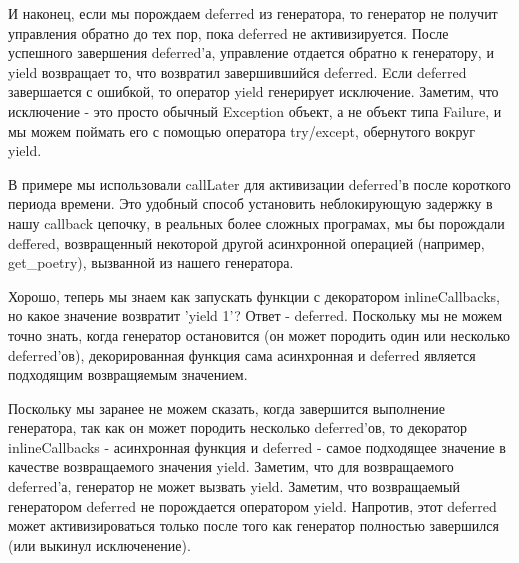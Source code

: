 И наконец, если мы порождаем deferred из генератора, 
то генератор не получит управления обратно до тех пор, пока 
deferred не активизируется. После успешного завершения deferred'а, 
управление отдается обратно к генератору, и yield возвращает 
то, что возвратил завершившийся deferred. Eсли 
deferred завершается с ошибкой, то оператор yield генерирует 
исключение. Заметим, что исключение - это просто обычный 
Exception объект, а не объект типа Failure, и мы можем 
поймать его с помощью оператора try/except, обернутого вокруг yield.


В примере мы использовали callLater для активизации  
deferred'в после короткого периода времени. Это удобный 
способ установить неблокирующую задержку в нашу callback 
цепочку, в реальных более сложных програмах, 
мы бы порождали deffered, возвращенный 
некоторой другой асинхронной операцией (например, get\_poetry), 
вызванной из нашего генератора.


Хорошо, теперь мы знаем как запускать функции с декоратором inlineCallbacks, 
но какое значение возвратит 'yield 1'? Ответ - deferred. 
Поскольку мы не можем точно знать, 
когда генератор остановится (он может породить один или 
несколько deferred'ов), декорированная функция сама асинхронная и 
deferred является подходящим возвращяемым значением. 


Поскольку мы заранее не можем сказать, когда 
завершится выполнение генератора, так как он 
может породить несколько deferred'ов, то 
декоратор inlineCallbacks - асинхронная функция 
и deferred - самое подходящее значение в качестве 
возвращаемого значения yield. Заметим, что для возвращаемого  
deferred'а, генератор не может вызвать yield. Заметим, что 
возвращаемый генератором deferred не порождается оператором yield. 
Напротив, этот deferred может активизироваться только после того как 
генератор полностью завершился (или выкинул исключенение). 


